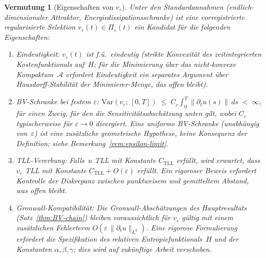 \documentclass[12pt,a4paper]{article}
\theoremstyle{definition}
\theoremstyle{plain}
\newtheorem{conjecture}[definition]{Vermutung}
\theoremstyle{remark}
\newcommand{\Var}{\mathrm{Var}}
\begin{document}
\begin{conjecture}[Eigenschaften von $v_\varepsilon$]
\label{conj:bv-regularity}
Unter den Standardannahmen (endlich-dimensionaler Attraktor,
Energiedissipationsschranke) ist eine vorregistrierte regularisierte
Selektion $v_\varepsilon(t)\in\Pi_\varepsilon(t)$ ein Kandidat für die
folgenden Eigenschaften:
\begin{enumerate}[label=(\roman*)]
\item \emph{Eindeutigkeit:}  $v_\varepsilon(t)$ ist f.ü.\ eindeutig
  (strikte Konvexität des zeitintegrierten Kostenfunktionals auf~$H$;
  für die Minimierung über das nicht-konvexe Kompaktum~$\mathcal{A}$
  erfordert Eindeutigkeit ein separates Argument über
  Hausdorff-Stabilität der Minimierer-Menge, das offen bleibt).
\item \emph{BV-Schranke bei festem \(\varepsilon\):}
  $\Var(v_\varepsilon;\,[0,T])
   \;\le\;
   C_\varepsilon
   \int_0^T \|\partial_t u(s)\|\,ds
   \;<\; \infty$,
  für einen Zweig, für den die Sensitivitätsabschätzung unten gilt,
  wobei $C_\varepsilon$ typischerweise für $\varepsilon \to 0$
  divergiert. Eine \emph{uniforme} BV-Schranke (unabhängig
  von~$\varepsilon$) ist eine zusätzliche geometrische Hypothese, keine
  Konsequenz der Definition; siehe Bemerkung~\ref{rem:epsilon-limit}.
\item \emph{TLL-Vererbung:}  Falls~$u$ TLL mit Konstante
  $C_{\mathrm{TLL}}$ erfüllt, wird erwartet, dass $v_\varepsilon$ TLL mit
  Konstante $C_{\mathrm{TLL}} + O(\varepsilon)$ erfüllt. Ein rigoroser
  Beweis erfordert Kontrolle der Diskrepanz zwischen punktweisem und
  gemitteltem Abstand, was offen bleibt.
\item \emph{Gronwall-Kompatibilität:}  Die Gronwall-Abschätzungen
  des Hauptresultats (Satz~\ref{thm:BV-chain}) bleiben voraussichtlich für
  $v_\varepsilon$ gültig mit einem zusätzlichen Fehlerterm
  $O(\varepsilon\,\|\partial_t u\|_{L^2})$. Eine rigorose Formulierung
  erfordert die Spezifikation des relativen Entropiefunktionals~$H$ und
  der Konstanten $\alpha, \beta, \gamma$; dies wird auf zukünftige Arbeit verschoben.
\end{enumerate}
\end{conjecture}
\end{document}
